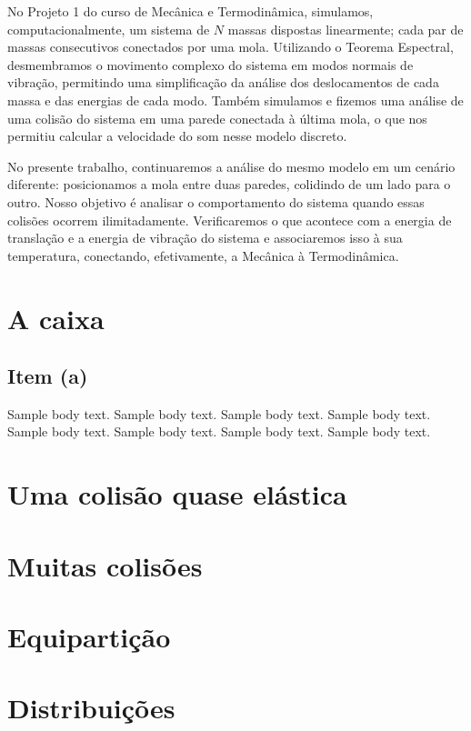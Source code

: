 \documentclass[pdflatex,sn-mathphys-num]{sn-jnl}%
\theoremstyle{thmstyleone}%
\theoremstyle{thmstyletwo}%
\theoremstyle{thmstylethree}%
\begin{document}
No Projeto 1 do curso de Mecânica e Termodinâmica, simulamos, computacionalmente, um sistema de \(N\) massas dispostas linearmente; cada par de massas consecutivos conectados por uma mola. Utilizando o Teorema Espectral, desmembramos o movimento complexo do sistema em modos normais de vibração, permitindo uma simplificação da análise dos deslocamentos de cada massa e das energias de cada modo. Também simulamos e fizemos uma análise de uma colisão do sistema em uma parede conectada à última mola, o que nos permitiu calcular a velocidade do som nesse modelo discreto.

No presente trabalho, continuaremos a análise do mesmo modelo em um cenário diferente: posicionamos a mola entre duas paredes, colidindo de um lado para o outro. Nosso objetivo é analisar o comportamento do sistema quando essas colisões ocorrem ilimitadamente. Verificaremos o que acontece com a energia de translação e a energia de vibração do sistema e associaremos isso à sua temperatura, conectando, efetivamente, a Mecânica à Termodinâmica.

\section{A caixa}\label{sec1}

\subsection{Item (a)}\label{subsec2}

Sample body text. Sample body text. Sample body text. Sample body text. Sample body text. Sample body text. Sample body text. Sample body text. 

\section{Uma colisão quase elástica}\label{sec2}

\section{Muitas colisões}\label{sec3}

\section{Equipartição}\label{sec4}

\section{Distribuições}\label{sec5}
\end{document}
